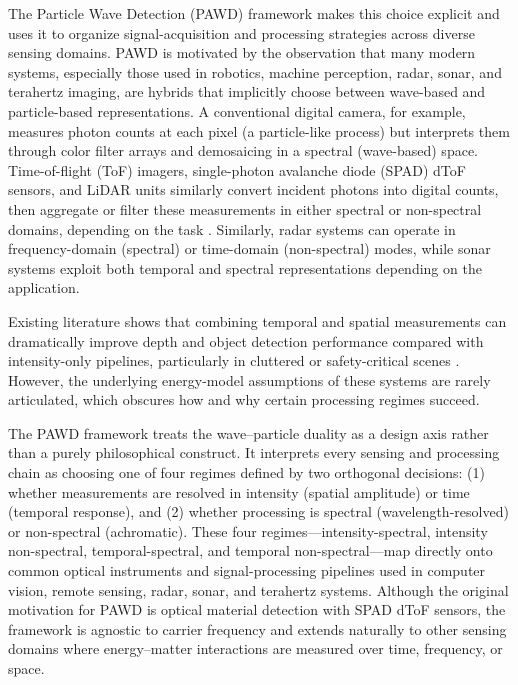 \documentclass[11pt]{article}
\begin{document}
The Particle Wave Detection (PAWD) framework makes this choice explicit and uses it to organize signal-acquisition and processing strategies across diverse sensing domains. PAWD is motivated by the observation that many modern systems, especially those used in robotics, machine perception, radar, sonar, and terahertz imaging, are hybrids that implicitly choose between wave-based and particle-based representations. A conventional digital camera, for example, measures photon counts at each pixel (a particle-like process) but interprets them through color filter arrays and demosaicing in a spectral (wave-based) space. Time-of-flight (ToF) imagers, single-photon avalanche diode (SPAD) dToF sensors, and LiDAR units similarly convert incident photons into digital counts, then aggregate or filter these measurements in either spectral or non-spectral domains, depending on the task \cite{su2016,becker2023}. Similarly, radar systems can operate in frequency-domain (spectral) or time-domain (non-spectral) modes, while sonar systems exploit both temporal and spectral representations depending on the application.

Existing literature shows that combining temporal and spatial measurements can dramatically improve depth and object detection performance compared with intensity-only pipelines, particularly in cluttered or safety-critical scenes \cite{moramartin2021,lyons2019}. However, the underlying energy-model assumptions of these systems are rarely articulated, which obscures how and why certain processing regimes succeed.

The PAWD framework treats the wave--particle duality as a design axis rather than a purely philosophical construct. It interprets every sensing and processing chain as choosing one of four regimes defined by two orthogonal decisions: (1) whether measurements are resolved in intensity (spatial amplitude) or time (temporal response), and (2) whether processing is spectral (wavelength-resolved) or non-spectral (achromatic). These four regimes---intensity-spectral, intensity non-spectral, temporal-spectral, and temporal non-spectral---map directly onto common optical instruments and signal-processing pipelines used in computer vision, remote sensing, radar, sonar, and terahertz systems. Although the original motivation for PAWD is optical material detection with SPAD dToF sensors, the framework is agnostic to carrier frequency and extends naturally to other sensing domains where energy--matter interactions are measured over time, frequency, or space.
\end{document}
